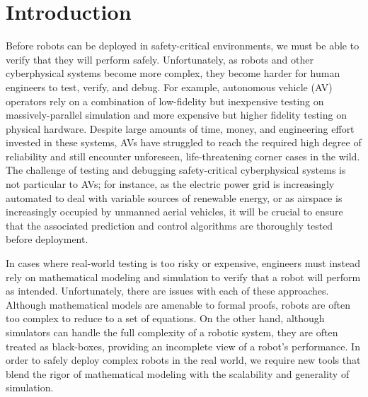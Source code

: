 \chapter{Introduction}\label{section:introduction}

Before robots can be deployed in safety-critical environments, we must be able to verify that they will perform safely. Unfortunately, as robots and other cyberphysical systems become more complex, they become harder for human engineers to test, verify, and debug. For example, autonomous vehicle (AV) operators rely on a combination of low-fidelity but inexpensive testing on massively-parallel simulation and more expensive but higher fidelity testing on physical hardware. Despite large amounts of time, money, and engineering effort invested in these systems, AVs have struggled to reach the required high degree of reliability and still encounter unforeseen, life-threatening corner cases in the wild. The challenge of testing and debugging safety-critical cyberphysical systems is not particular to AVs; for instance, as the electric power grid is increasingly automated to deal with variable sources of renewable energy, or as airspace is increasingly occupied by unmanned aerial vehicles, it will be crucial to ensure that the associated prediction and control algorithms are thoroughly tested before deployment.

In cases where real-world testing is too risky or expensive, engineers must instead rely on mathematical modeling and simulation to verify that a robot will perform as intended. Unfortunately, there are issues with each of these approaches. Although mathematical models are amenable to formal proofs, robots are often too complex to reduce to a set of equations. On the other hand, although simulators can handle the full complexity of a robotic system, they are often treated as black-boxes, providing an incomplete view of a robot's performance. In order to safely deploy complex robots in the real world, we require new tools that blend the rigor of mathematical modeling with the scalability and generality of simulation.


